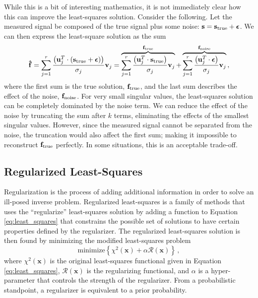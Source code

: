 While this is a bit of interesting mathematics, it is not immediately clear how this can improve the least-squares solution. Consider the following. Let the measured signal be composed of the true signal plus some noise: $\mathbf{s} = \mathbf{s}_{\rm{true}} + \boldsymbol{\epsilon}$. We can then express the least-square solution as the sum
\begin{equation}\label{eq:f_svd_sum}
    \mathbf{\hat{f}} = \sum_{j=1}^r \frac{\left(\mathbf{u}_j^T \cdot (\mathbf{s}_{\rm{true}} + \boldsymbol{\epsilon}) \right)}{\sigma_j} \mathbf{v}_j = \overbrace{\sum_{j=1}^r \frac{\left(\mathbf{u}_j^T \cdot \mathbf{s}_{\rm{true}} \right)}{\sigma_j} \mathbf{v}_j}^{\mathbf{f}_{\rm{true}}} + \overbrace{\sum_{j=1}^r \frac{\left(\mathbf{u}_j^T \cdot \boldsymbol{\epsilon} \right)}{\sigma_j} \mathbf{v}_j}^{\mathbf{f}_{\rm{noise}}}\,,
\end{equation}
where the first sum is the true solution, $\mathbf{f}_{\rm{true}}$, and the last sum describes the effect of the noise, $\mathbf{f}_{\rm{noise}}$. For very small singular values, the least-squares solution can be completely dominated by the noise term. We can reduce the effect of the noise by truncating the sum after $k$ terms, eliminating the effects of the smallest singular values. However, since the measured signal cannot be separated from the noise, the truncation would also affect the first sum; making it impossible to reconstruct $\mathbf{f}_{\rm{true}}$ perfectly. In some situations, this is an acceptable trade-off. 

\subsection{Regularized Least-Squares}
Regularization is the process of adding additional information in order to solve an ill-posed inverse problem. Regularized least-squares is a family of methods that uses the ``regularize'' least-squares solution by adding a function to Equation \ref{eq:least_squares} that constrains the possible set of solutions to have certain properties defined by the regularizer. The regularized least-squares solution is then found by minimizing the modified least-squares problem
\begin{equation}\label{eq:regularized_least_squares}
    \mathrm{minimize} \left \lbrace \chi^2(\mathbf{x}) + \alpha \mathcal{R}(\mathbf{x}) \right \rbrace \,,
\end{equation}
where $\chi^2(\mathbf{x})$ is the original least-squares functional given in Equation \ref{eq:least_squares}, $\mathcal{R}(\mathbf{x})$ is the regularizing functional, and $\alpha$ is a hyper-parameter that controls the strength of the regularizer. From a probabilistic standpoint, a regularizer is equivalent to a prior probability. 

